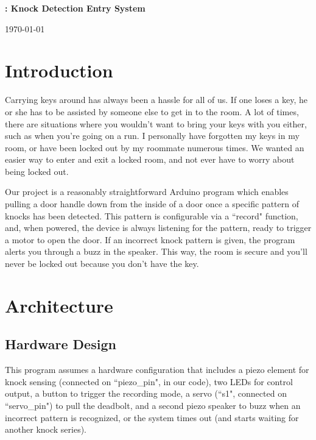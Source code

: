 \documentclass[11pt]{article}			%
\author{Matt Nichols}
\date{\today}
\begin{document}
\centerline{\bf \LARGE\thishw: Knock Detection Entry System}
\centerline{\today}

\section{Introduction}
Carrying keys around has always been a hassle for all of us. If one loses a key, he or she has to be assisted by someone else to get in to the room. A lot of times, there are situations where you wouldn't want to bring your keys with you either, such as when you're going on a run. I personally have forgotten my keys in my room, or have been locked out by my roommate numerous times. We wanted an easier way to enter and exit a locked room, and not ever have to worry about being locked out. 

Our project is a reasonably straightforward Arduino program which enables pulling a door handle down from the inside of a door once a specific pattern of knocks has been detected. This pattern is configurable via a ``record" function, and, when powered, the device is always listening for the pattern, ready to trigger a motor to open the door. If an incorrect knock pattern is given, the program alerts you through a buzz in the speaker. This way, the room is secure and you'll never be locked out because you don't have the key.

\section{Architecture}

\subsection{Hardware Design}

This program assumes a hardware configuration that includes a piezo element for knock sensing (connected on ``piezo\_pin", in our code), two LEDs for control output, a button to trigger the recording mode, a servo (``s1", connected on ``servo\_pin") to pull the deadbolt, and a second piezo speaker to buzz when an incorrect pattern is recognized, or the system times out (and starts waiting for another knock series).
\end{document}
